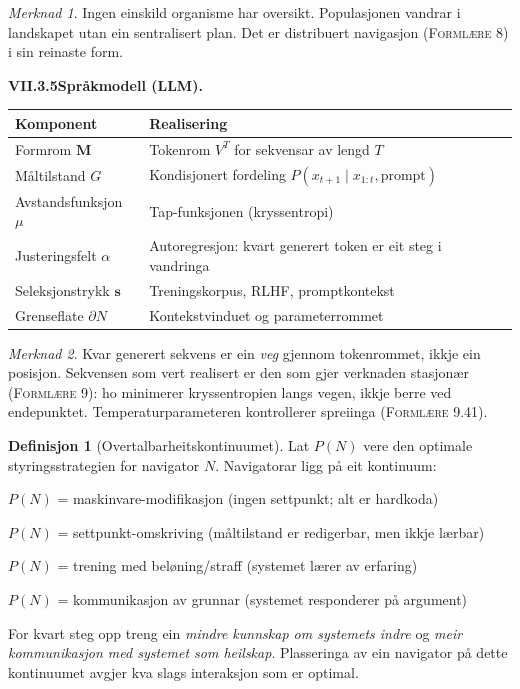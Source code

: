 \documentclass[11pt, a4paper]{article}
\theoremstyle{definition}
\newtheorem{defn}{Definisjon}[section]
\theoremstyle{plain}
\theoremstyle{remark}
\newtheorem*{merknad}{Merknad}
\newcommand{\svec}{\mathbf{s}}
\newcommand{\formlaere}{\textsc{Forml\ae re}}
\begin{document}
\begin{merknad}
Ingen einskild organisme har oversikt. Populasjonen vandrar i landskapet utan ein
sentralisert plan. Det er distribuert navigasjon (\formlaere{} 8) i sin reinaste form.
\end{merknad}

\bigskip
\noindent\textbf{VII.3.5\quad Spr\aa kmodell (LLM).}

\medskip
\begin{center}
\begin{tabular}{@{}l >{\raggedright\arraybackslash}p{8cm}@{}}
\toprule
\textbf{Komponent} & \textbf{Realisering} \\
\midrule
Formrom $\mathbf{M}$         & Tokenrom $V^T$ for sekvensar av lengd $T$ \\
M\aa ltilstand $G$            & Kondisjonert fordeling $P(x_{t+1} \mid x_{1:t}, \text{prompt})$ \\
Avstandsfunksjon $\mu$        & Tap-funksjonen (kryssentropi) \\
Justeringsfelt $\alpha$       & Autoregresjon: kvart generert token er eit steg i vandringa \\
Seleksjonstrykk $\svec$       & Treningskorpus, RLHF, promptkontekst \\
Grenseflate $\partial N$      & Kontekstvinduet og parameterrommet \\
\bottomrule
\end{tabular}
\end{center}

\begin{merknad}
Kvar generert sekvens er ein \emph{veg} gjennom tokenrommet, ikkje ein posisjon.
Sekvensen som vert realisert er den som gjer verknaden stasjon\ae r (\formlaere{} 9):
ho minimerer kryssentropien langs vegen, ikkje berre ved endepunktet.
Temperaturparameteren kontrollerer spreiinga (\formlaere{} 9.41).
\end{merknad}

\bigskip

\begin{defn}[Overtalbarheitskontinuumet]
\label{def:overtalbarheit}
Lat $P(N)$ vere den optimale styringsstrategien for navigator $N$.
Navigatorar ligg p\aa{} eit kontinuum:
\begin{description}[font=\normalfont\itshape, leftmargin=2.5cm, labelwidth=1.8cm]
  \item[Klasse A:] $P(N)$ = maskinvare-modifikasjon
    (ingen settpunkt; alt er hardkoda)
  \item[Klasse B:] $P(N)$ = settpunkt-omskriving
    (m\aa ltilstand er redigerbar, men ikkje l\ae rbar)
  \item[Klasse C:] $P(N)$ = trening med bel\o ning/straff
    (systemet l\ae rer av erfaring)
  \item[Klasse D:] $P(N)$ = kommunikasjon av grunnar
    (systemet responderer p\aa{} argument)
\end{description}
For kvart steg opp treng ein \emph{mindre kunnskap om systemets indre} og \emph{meir
kommunikasjon med systemet som heilskap}. Plasseringa av ein navigator p\aa{} dette
kontinuumet avgjer kva slags interaksjon som er optimal.
\end{defn}
\end{document}
